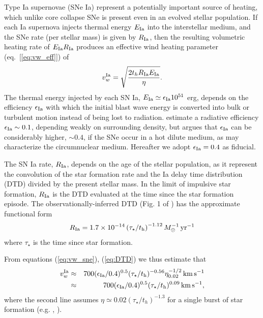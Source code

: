 \documentclass[usenatbib,fleqn]{mn2e}
\newcommand{\RateIa}{R_{\rm Ia}}
\begin{document}
Type Ia supernovae (SNe Ia) represent a potentially important source of heating, which unlike core collapse SNe is present even in an evolved stellar population.  If each Ia supernova injects thermal energy $E_{\rm Ia}$ into the interstellar medium, and the SNe rate (per stellar mass) is given by $R_{\rm   Ia}$, then the resulting volumetric heating rate of $E_{\rm Ia}R_{\rm  Ia}$ produces an effective wind heating parameter (eq.~[\ref{eq:vw_eff}]) of \begin{align} v_{w}^{\rm Ia} =\sqrt{\frac{2 t_h R_{\rm Ia}
E_{\rm Ia}}{\eta}} \label{eq:vw_sne}.
\end{align} The thermal energy injected by each SN Ia, $E_{\rm Ia} \simeq
\epsilon_{\rm Ia} 10^{51}$ erg, depends on the efficiency $\epsilon_{\rm Ia}$
with which the initial blast wave energy is converted into bulk or turbulent
motion instead of being lost to radiation.  \cite{Thornton+98}
estimate a radiative efficiency $\epsilon_{\rm Ia} \sim 0.1$,
depending weakly on surrounding density, but \citet{Sharma+14} argues
that $\epsilon_{\rm Ia}$ can be considerably higher, $\sim 0.4$, if
the SNe occur in a hot dilute medium, as may characterize the circumnuclear medium.  Hereafter we adopt $\epsilon_{\rm Ia} = 0.4$ as fiducial.

The SN Ia rate, $\RateIa$, depends on the age of the stellar population, as it represent the convolution of the star formation rate and the Ia delay time distribution (DTD) divided by the present stellar mass.  In
the limit of impulsive star formation, $\RateIa$ is the DTD evaluated at the time since the star formation episode.  The observationally-inferred DTD (Fig. 1 of \citealt{MaozMannucci+:2012a}) has the
approximate functional form \begin{align}
  R_{\rm Ia} =1.7\times 10^{-14}\left(\tau_{\star}/t_{\rm
      h}\right)^{-1.12} M_{\odot}^{-1}\,{\rm yr^{-1}}
\label{eq:DTD}
  \end{align}
  where $\tau_{\star}$ is the time since star formation.

From equations (\ref{eq:vw_sne}), (\ref{eq:DTD}) we thus estimate that 
  \begin{eqnarray} 
    v_{w}^{\rm Ia} &\approx& 700(\epsilon_{\rm
      Ia}/0.4)^{0.5}(\tau_{\star}/t_{\rm h})^{-0.56}\eta_{0.02}^{-1/2}\,{\rm km
      \,s^{-1}} \nonumber \\
&\approx& 700(\epsilon_{\rm
      Ia}/0.4)^{0.5}(\tau_{\star}/t_{\rm h})^{0.09}\,{\rm km
      \,s^{-1}},
\label{eq:vIa}
  \end{eqnarray}
where the second line assumes $\eta\simeq 0.02 (\tau_{\star}/t_h)^{-1.3}$ for a single burst of star formation (e.g. , \citealt{Ciotti+91}).
\end{document}
